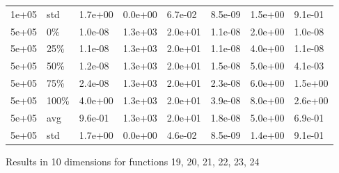 \begin{longtable}{llllllll}
  1e+05 & std & 1.7e+00 & 0.0e+00 & 6.7e-02 & 8.5e-09 & 1.5e+00 & 9.1e-01 \\ 
  5e+05 & 0\% & 1.0e-08 & 1.3e+03 & 2.0e+01 & 1.1e-08 & 2.0e+00 & 1.0e-08 \\ 
  5e+05 & 25\% & 1.1e-08 & 1.3e+03 & 2.0e+01 & 1.1e-08 & 4.0e+00 & 1.1e-08 \\ 
  5e+05 & 50\% & 1.2e-08 & 1.3e+03 & 2.0e+01 & 1.5e-08 & 5.0e+00 & 4.1e-03 \\ 
  5e+05 & 75\% & 2.4e-08 & 1.3e+03 & 2.0e+01 & 2.3e-08 & 6.0e+00 & 1.5e+00 \\ 
  5e+05 & 100\% & 4.0e+00 & 1.3e+03 & 2.0e+01 & 3.9e-08 & 8.0e+00 & 2.6e+00 \\ 
  5e+05 & avg & 9.6e-01 & 1.3e+03 & 2.0e+01 & 1.8e-08 & 5.0e+00 & 6.9e-01 \\ 
  5e+05 & std & 1.7e+00 & 0.0e+00 & 4.6e-02 & 8.5e-09 & 1.4e+00 & 9.1e-01 \\ 
   \hline
\hline
\end{longtable}
\newpage
Results in 10 dimensions for functions 19, 20, 21, 22, 23, 24
